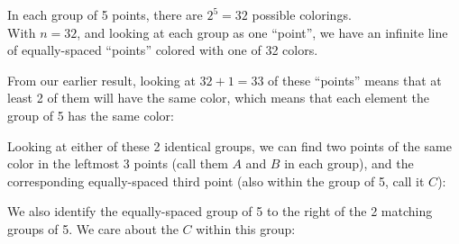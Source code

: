\documentclass[11pt]{article}
\edef\getxnow(#1,#2){#1}
\edef\getynow(#1,#2){#2}
\newcommand*{\getx}[1]{\expandafter\getxnow#1}
\newcommand*{\gety}[1]{\expandafter\getynow#1}
\newcommand*{\scalePic}{0.4}
\newcommand*{\gridArg}[7]{%
    \foreach \x in {\fpeval{#1},\fpeval{#1+#2},...,\fpeval{#3+0.0001}} %
        \draw [black, thin, #7] (\x,\fpeval{#4}) -- (\x,\fpeval{#6+0.0001});
    \foreach \y in {\fpeval{#4},\fpeval{#4+#5},...,\fpeval{#6+0.0001}}
        \draw [black, thin, #7] (\fpeval{#1},\y) -- (\fpeval{#3+0.0001},\y);
}
\newcommand*{\grid}[6]{\gridArg{#1}{#2}{#3}{#4}{#5}{#6}{}}%
\newcommand*{\mybigbox}[4]{\grid{#1}{#3}{#1+#3}{#2}{#4}{#2+#4}} %
\newcommand*{\mybox}[2]{\mybigbox{#1}{#2}{1}{1}} %
\newcommand*{\myboxes}[1]{\foreach \pt in {#1} {\mybox{\getx{\pt}}{\gety{\pt}}}}
\newcommand*{\labelabove}[3]{\node[above, outer sep=5pt] at (#1 + 0.5, #2 + 0.5){#3};} %
\begin{document}
In each group of 5 points, there are $2^5 = 32$ possible colorings.\\
With $n=32$, and looking at each group as one ``point'', we have an infinite line of equally-spaced ``points'' colored with one of 32 colors.

From our earlier result, looking at $32+1=33$ of these ``points'' means that at least 2 of them will have the same color, which means that each element the group of 5 has the same color:

\begin{center}
\end{center}

Looking at either of these 2 identical groups, we can find two points of the same color in the leftmost 3 points (call them $A$ and $B$ in each group), and the corresponding equally-spaced third point (also within the group of 5, call it $C$):

\begin{center}
\end{center}

We also identify the equally-spaced group of 5 to the right of the 2 matching groups of 5. We care about the $C$ within this group:

\begin{center}
\end{center}
\end{document}

